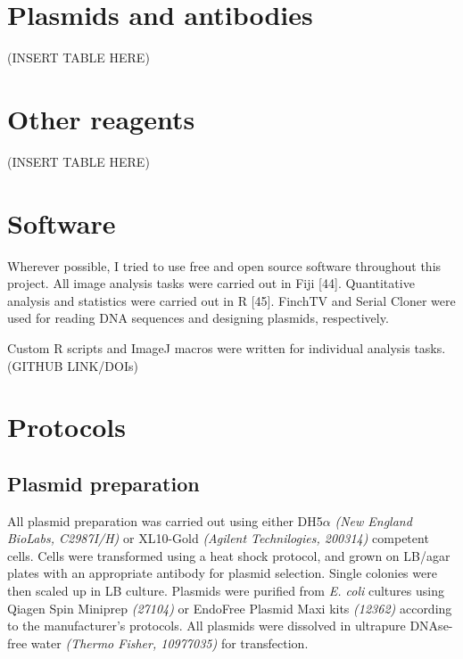 \documentclass[
  12pt,
  a4paper,
]{book}
\begin{document}

\hypertarget{plasmids-and-antibodies}{%
\section{Plasmids and antibodies}\label{plasmids-and-antibodies}}

(INSERT TABLE HERE)

\hypertarget{other-reagents}{%
\section{Other reagents}\label{other-reagents}}

(INSERT TABLE HERE)

\hypertarget{software}{%
\section{Software}\label{software}}

Wherever possible, I tried to use free and open source software throughout this project. All image analysis tasks were carried out in Fiji {[}44{]}. Quantitative analysis and statistics were carried out in R {[}45{]}. FinchTV and Serial Cloner were used for reading DNA sequences and designing plasmids, respectively.

Custom R scripts and ImageJ macros were written for individual analysis tasks. (GITHUB LINK/DOIs)

\hypertarget{protocols}{%
\section{Protocols}\label{protocols}}

\hypertarget{plasmid-prep}{%
\subsection{Plasmid preparation}\label{plasmid-prep}}

All plasmid preparation was carried out using either DH5\(\alpha\) \emph{(New England BioLabs, C2987I/H)} or XL10-Gold \emph{(Agilent Technilogies, 200314)} competent cells. Cells were transformed using a heat shock protocol, and grown on LB/agar plates with an appropriate antibody for plasmid selection. Single colonies were then scaled up in LB culture. Plasmids were purified from \emph{E. coli} cultures using Qiagen Spin Miniprep \emph{(27104)} or EndoFree Plasmid Maxi kits \emph{(12362)} according to the manufacturer's protocols. All plasmids were dissolved in ultrapure DNAse-free water \emph{(Thermo Fisher, 10977035)} for transfection.
\end{document}
